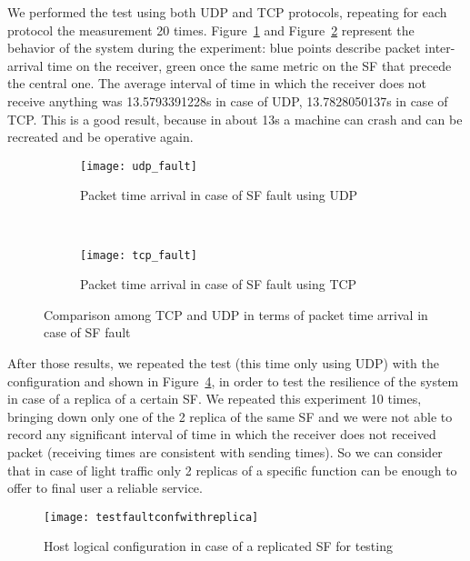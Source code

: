 We performed the test using both UDP and TCP protocols, repeating for each
protocol the measurement 20 times.
Figure~\ref{chap:tests:sec:fault:img:faultgraphudp} and
Figure~\ref{chap:tests:sec:fault:img:faultgraphtcp} represent the behavior of
the system during the experiment: blue points describe packet inter-arrival
time on the receiver, green once the same metric on the SF that precede the
central one. The average interval of time in which the
receiver does not receive anything was 13.5793391228s in case of UDP,
13.7828050137s in case of TCP. This is a good result, because in about 13s a
machine can crash and can be recreated and be operative again. 

\begin{figure}[]
    \begin{subfigure}[b]{0.9\textwidth}
        \texttt{[image: udp\_fault]}
        \caption{Packet time arrival in case of SF fault using UDP}
        \label{chap:tests:sec:fault:img:faultgraphudp}
    \end{subfigure}
    \\
    \begin{subfigure}[b]{0.9\textwidth}
        \texttt{[image: tcp\_fault]}
        \caption{Packet time arrival in case of SF fault using TCP}
        \label{chap:tests:sec:fault:img:faultgraphtcp}
    \end{subfigure}
    \caption{Comparison among TCP and UDP in terms of packet time arrival in
    case of SF fault}
    \label{chap:tests:sec:fault:img:faultgrapht}
\end{figure}

After those results, we repeated the test (this time only using UDP) with the
configuration and shown in
Figure~\ref{chap:tests:sec:fault:img:testfaultconfwithreplica}, in order to
test the resilience of the system in case of a replica of a certain SF. We
repeated this experiment 10 times, bringing down only one of the 2 replica of
the same SF and we were not able to record any significant interval of time in
which the receiver does not received packet (receiving times are consistent
with sending times). So we can consider that in case of light traffic only 2
replicas of a specific function can be enough to offer to final user a reliable
service.

\begin{figure}[H]
  \centering
  \texttt{[image: testfaultconfwithreplica]}
  \caption{Host logical configuration in case of a replicated SF for testing}
  \label{chap:tests:sec:fault:img:testfaultconfwithreplica}
\end{figure}